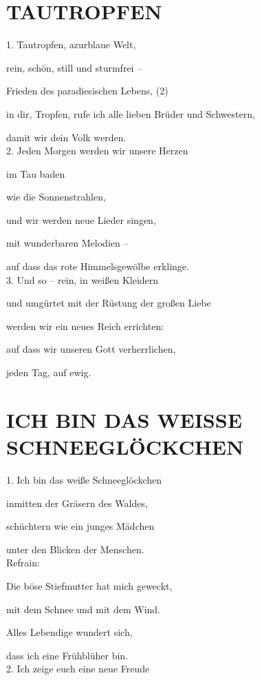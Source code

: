 \documentclass[11pt,a5paper,twoside]{article}
\begin{document}
\section[Tautropfen]{TAUTROPFEN}

1. Tautropfen, azurblaue Welt,

rein, schön, still und sturmfrei --

Frieden des paradiesischen Lebens, (2)

in dir, Tropfen, rufe ich alle lieben Brüder und Schwestern, 

damit wir dein Volk werden.\\

2. Jeden Morgen werden wir unsere Herzen

im Tau baden

wie die Sonnenstrahlen,
  
und wir werden neue Lieder singen,

mit wunderbaren Melodien --

auf dass das rote Himmelsgewölbe erklinge.\\

3. Und so -- rein, in weißen Kleidern

und umgürtet mit der Rüstung der großen Liebe 

werden wir ein neues Reich errichten:

auf dass wir unseren Gott verherrlichen, 

jeden Tag, auf ewig.

\section[Ich bin das weiße Schneeglöckchen]{ICH BIN DAS WEISSE SCHNEEGLÖCKCHEN}

1. Ich bin das weiße Schneeglöckchen

inmitten der Gräsern des Waldes,

schüchtern wie ein junges Mädchen 

unter den Blicken der Menschen. \\

Refrain:

Die böse Stiefmutter hat mich geweckt, 

mit dem Schnee und mit dem Wind. 

Alles Lebendige wundert sich, 

dass ich eine Frühblüher bin.\\

2. Ich zeige euch eine neue Freude
\end{document}
